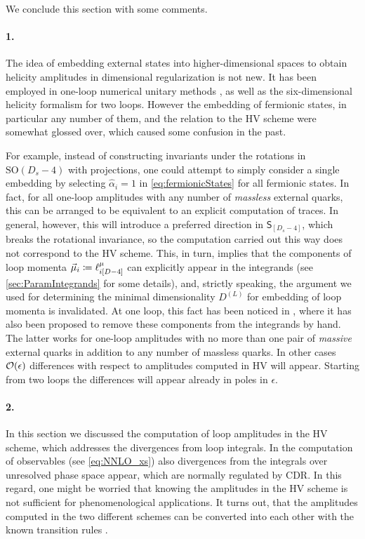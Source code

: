 We conclude this section with some comments.
\paragraph{1.} 
The idea of embedding external states into higher-dimensional spaces to obtain
helicity amplitudes in dimensional regularization is not new. 
It has been employed in one-loop numerical unitary methods \cite{Ellis:2007br,Giele:2008ve}, as well as 
the six-dimensional helicity formalism \cite{Bern2011,Cheung:2009dc,Badger:2013gxa,Badger:2017jhb} for two loops.
However the embedding of fermionic states, in particular any number of them,
and the relation to the HV scheme were somewhat glossed over,
which caused some confusion in the past.

For example, instead of constructing invariants under the rotations in $\mathrm{SO}(D_s-4)$
with projections, one could attempt to simply consider a single embedding by
selecting $\hat{\alpha}_i=1$ in \cref{eq:fermionicStates} for all fermionic states.
In fact, for all one-loop amplitudes with any number of \emph{massless} external quarks,
this can be arranged \cite{Anger:2018ove}
to be equivalent to an explicit computation of traces.
In general, however, this will introduce a preferred direction in $\mathsf{S}_{[D_s-4]}$,
which breaks the rotational invariance, 
so the computation carried out this way does not correspond to the HV scheme.
This, in turn, implies that the components of loop momenta $\va{\mu}_i \coloneqq \ell^\mu_{i[D-4]}$ can explicitly appear in the integrands (see \cref{sec:ParamIntegrands} for some details),
and, strictly speaking, the argument we used for determining the minimal dimensionality $D^{(L)}$ for embedding of loop momenta is invalidated.
At one loop, this fact has been noticed in \cite{Fazio:2014xea,Badger:2017gta},
where it has also been proposed to remove these components from the integrands by hand.
The latter works for one-loop amplitudes with no more than one pair of \emph{massive} external quarks in addition
to any number of massless quarks.
In other cases $\order{\epsilon}$ differences with respect to amplitudes computed in HV will appear.
Starting from two loops the differences will appear already in poles in $\epsilon$. 

\paragraph{2.}
In this section we discussed the computation of loop amplitudes in the HV scheme, which addresses the divergences from loop integrals.
In the computation of observables (see \cref{eq:NNLO_xs}) also divergences from the integrals over unresolved phase space appear,
which are normally regulated by CDR.
In this regard, one might be worried that knowing the amplitudes in the HV scheme is not sufficient for phenomenological applications.
It turns out, that the amplitudes computed in the two different schemes can be converted into each other with the known transition rules \cite{Broggio:2015dga}.

